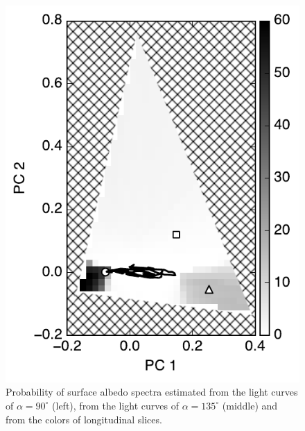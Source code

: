 \documentclass[iop,numberedappendix,apj]{emulateapj}
\begin{document}
\begin{figure}[tbh!]
\begin{minipage}{0.33\hsize}
\begin{center}
\includegraphics[width=\hsize]{IGBP_lon_noreg_allowedregion_gray.pdf}
    \end{center}
     \end{minipage}
    \caption{Probability of surface albedo spectra estimated from the light curves of $\alpha = 90^{\circ }$ (left), from the light curves of $\alpha = 135^{\circ }$ (middle) and from the colors of longitudinal slices. }
\label{fig:PCplane}
\end{figure}
\end{document}
